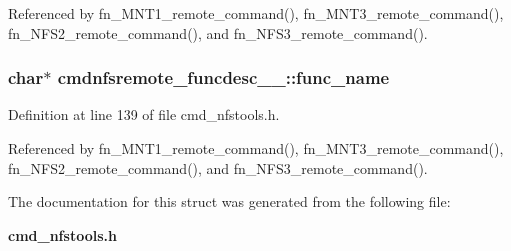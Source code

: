 Referenced by fn\_\-MNT1\_\-remote\_\-command(), fn\_\-MNT3\_\-remote\_\-command(), fn\_\-NFS2\_\-remote\_\-command(), and fn\_\-NFS3\_\-remote\_\-command().
\subsubsection{\setlength{\rightskip}{0pt plus 5cm}char$\ast$ {\bf cmdnfsremote\_\-funcdesc\_\-\_\-::func\_\-name}}\label{structcmdnfsremote__funcdesc_____o0}




Definition at line 139 of file cmd\_\-nfstools.h.

Referenced by fn\_\-MNT1\_\-remote\_\-command(), fn\_\-MNT3\_\-remote\_\-command(), fn\_\-NFS2\_\-remote\_\-command(), and fn\_\-NFS3\_\-remote\_\-command().

The documentation for this struct was generated from the following file:\begin{CompactItemize}
\item 
{\bf cmd\_\-nfstools.h}\end{CompactItemize}
